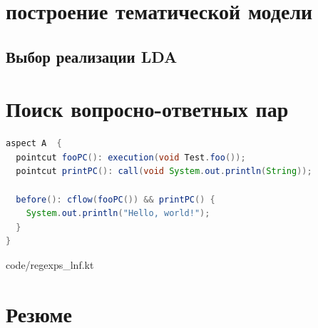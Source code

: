 \section{построение тематической модели}
\subsection{Выбор реализации LDA}
\label{sec:lda_choose}
\section{Поиск вопросно-ответных пар}

\Blindtext

  \begin{lstlisting}[language=Java, label={lst:aspectj_example}, 
  caption={Пример описания аспектов в AspectJ}]
aspect A  {
  pointcut fooPC(): execution(void Test.foo());
  pointcut printPC(): call(void System.out.println(String));
  
  before(): cflow(fooPC()) && printPC() {
    System.out.println("Hello, world!");
  }
}
  \end{lstlisting}


{code/regexps_lnf.kt}

\section{Резюме}

\Blindtext
